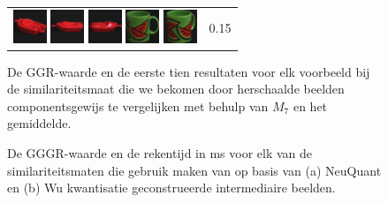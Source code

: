 {\begin{figure}[p]
\begin{tabular}{m{11cm} | m{3cm} |}
\includegraphics[width=1cm]{coil/beeld-22.eps}
\includegraphics[width=1cm]{coil/beeld-18.eps}
\includegraphics[width=1cm]{coil/beeld-19.eps}
\includegraphics[width=1cm]{coil/beeld-30.eps}
\includegraphics[width=1cm]{coil/beeld-33.eps}
& {\scriptsize 0.15}
\\
\end{tabular}
\vspace{5pt}
\caption{\label{fig:results_beste_scaling}De GGR-waarde en de eerste tien resultaten voor elk 
voorbeeld bij de similariteitsmaat die we bekomen door herschaalde beelden componentsgewijs 
te vergelijken met behulp van $M_7$ en het gemiddelde.}
\end{figure}

\begin{figure}[p]
\vspace{5pt}
\centering
{}
\caption{\label{fig:dom_colors_gggrs_en_cputimes}De GGGR-waarde en de rekentijd in ms 
voor elk van de similariteitsmaten die gebruik maken 
van op basis van (a) NeuQuant en (b) Wu kwantisatie geconstrueerde intermediaire beelden.}
\end{figure}

}
